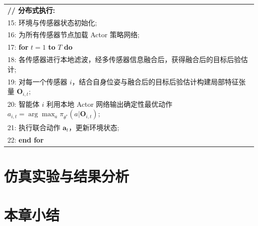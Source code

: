 \begin{table}[htbp]
\begin{tabular}{p{}}
    \textbf{// 分布式执行:} \\
    15: 环境与传感器状态初始化; \\
    16: 为所有传感器节点加载 Actor 策略网络; \\
    17: \textbf{for} $t = 1$ \textbf{to} $T$ \textbf{do} \\
    18: \quad 各传感器进行本地滤波，经多传感器信息融合后，获得融合后的目标后验估计; \\
    19: \quad 对每一个传感器 $i$，结合自身位姿与融合后的目标后验估计构建局部特征张量 $\mathbf{O}_{i,t}$; \\
    20: \quad 智能体 $i$ 利用本地 Actor 网络输出确定性最优动作 $a_{i,t} = \arg\max_a \pi_{\theta^*}(a|\mathbf{O}_{i,t})$; \\
    21: \quad 执行联合动作 $\mathbf{a}_t$，更新环境状态; \\
    22: \textbf{end for} \\
    \bottomrule
  \end{tabular}
\end{table}



\section{仿真实验与结果分析}
\section{本章小结}

